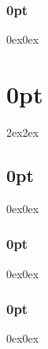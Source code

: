 \documentclass[11pt]{report}
\begin{document}
\begin{flushleft}
    \LARGE{\yourThesisTitle}
\end{flushleft}
\subsectionfont{\fontsize{13}{16}\normalfont}
\titlespacing\subsection{0pt}{0ex}{0ex}
\subsection*{\yourNameInclTitle}
\vspace{-0.5em}
\noindent{\textit{\universityCityCountry}}
\vspace{1em}

\titleformat{\chapter}{\normalfont\large}{\thechapter}{20pt}{\normalfont\large\MakeUppercase}
\chapterfont{\fontsize{13}{16}\normalfont\MakeUppercase}
\titlespacing\chapter{0pt}{2ex}{2ex}
\sectionfont{\fontsize{13}{16}\normalfont}
\titlespacing\section{0pt}{0ex}{0ex}
\subsectionfont{\fontsize{13}{16}\normalfont}
\titlespacing\subsection{0pt}{0ex}{0ex}
\subsubsectionfont{\fontsize{13}{16}\normalfont}
\titlespacing\subsection{0pt}{0ex}{0ex}
\setcounter{secnumdepth}{5}

\makeatletter
\patchcmd{\chapter}{\clearpage}{}{}{}
\makeatother

\acresetall

\acresetall

\newpage

\newpage

\newpage




\titleformat{\chapter}{\normalfont\Large}{\thechapter}{20pt}{\normalfont\Large}

\newpage
\printbibliography[title=\literatureLabel]
\end{document}
